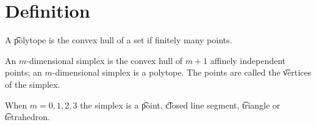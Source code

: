 
\section*{Definition}

A \t{polytope} is the convex hull of a set if finitely many points.

An \t{$m$-dimensional simplex} is the convex hull of $m+1$ affinely independent points; an $m$-dimensional simplex is a polytope.
The points are called the \t{vertices} of the simplex.

When $m = 0, 1, 2, 3$ the simplex is a \t{point}, \t{closed line segment}, \t{triangle} or \t{tetrahedron}.

\blankpage